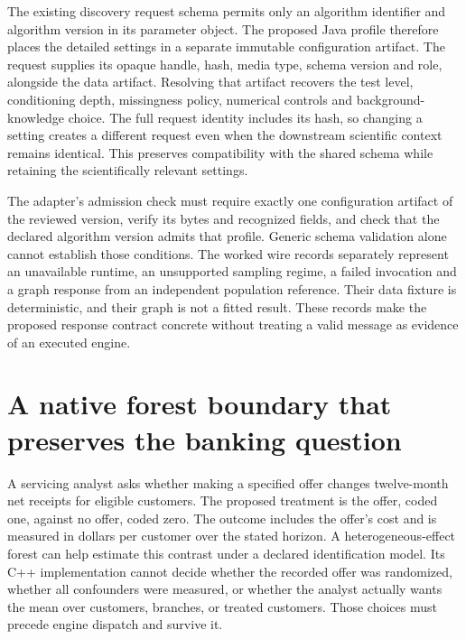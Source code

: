 The existing discovery request schema permits only an algorithm
identifier and algorithm version in its parameter object. The proposed
Java profile therefore places the detailed settings in a separate
immutable configuration artifact. The request supplies its opaque
handle, hash, media type, schema version and role, alongside the data
artifact. Resolving that artifact recovers the test level, conditioning
depth, missingness policy, numerical controls and background-knowledge
choice. The full request identity includes its hash, so changing a
setting creates a different request even when the downstream scientific
context remains identical. This preserves compatibility with the shared
schema while retaining the scientifically relevant settings.
\citep{exec13_java_adapter_contract}

The adapter's admission check must require exactly one configuration
artifact of the reviewed version, verify its bytes and recognized
fields, and check that the declared algorithm version admits that
profile. Generic schema validation alone cannot establish those
conditions. The worked wire records separately represent an unavailable
runtime, an unsupported sampling regime, a failed invocation and a graph
response from an independent population reference. Their data fixture is
deterministic, and their graph is not a fitted result. These records
make the proposed response contract concrete without treating a valid
message as evidence of an executed engine. \label{exec13:java-wire-end}


\section{A native forest boundary that preserves the banking question}
\label{exec13:grf-adapter}

A servicing analyst asks whether making a specified offer changes
twelve-month net receipts for eligible customers. The proposed treatment
is the offer, coded one, against no offer, coded zero. The outcome
includes the offer's cost and is measured in dollars per customer over
the stated horizon. A heterogeneous-effect forest can help estimate this
contrast under a declared identification model. Its C++ implementation
cannot decide whether the recorded offer was randomized, whether all
confounders were measured, or whether the analyst actually wants the
mean over customers, branches, or treated customers. Those choices must
precede engine dispatch and survive it.

